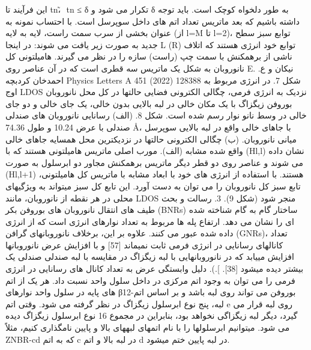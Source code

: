 این فرآیند تا tn، ̃ tn ≤ δ تکرار می شود و δ به طور دلخواه کوچک است. باید توجه داشته باشیم که بعد ماتریس تعداد اتم های داخل سوپرسل است. با احتساب نمونه به عنوان بخشی از سرب سمت راست، لایه به لایه (از l=M تا l=2)، توابع سبز سطح جدید به صورت زیر یافت می شوند:
در اینجا L (R) توابع خود انرژی هستند که اتلاف ناشی از برهمکنش با سمت چپ (راست) سازه را در نظر می گیرند. هامیلتونی کل نانوروبان به شکل یک ماتریس سه قطری است که در آن عناصر روی E. نیکان و ع. احمدخان کردبچه Physics Letters A 451 (2022) 128388 شکل 7. در انرژی مربوط به اوج LDOS نزدیک به انرژی فرمی، چگالی الکترونی فضایی حالتها در کل محل نانوروبان بوروفن زیگزاگ با یک مکان خالی در لبه بالایی بدون خالی، یک جای خالی و دو جای خالی در وسط نانو نوار رسم شده است. شکل 8. (الف) رسانایی نانوروبان های صندلی صندلی با عرض 10.24 و طول 74.36 Å، با جاهای خالی واقع در لبه بالایی سوپرسل میانی نانوروبان. (ب) چگالی الکترونی حالتها در نزدیکترین محل همسایه جاهای خالی واقع شده مشابه (الف). مورب اصلی ماتریس هامیلتونی هستند که با (Hl,l) نشان داده می شوند و عناصر روی دو قطر دیگر ماتریس برهمکنش مجاور دو ابرسلول به صورت (Hl,l+1) هستند. با استفاده از انرژی های خود با ابعاد مشابه با ماتریس کل هامیلتونی، تابع سبز کل نانوروبان را می توان به دست آورد. این تابع کل سبز میتواند به ویژگیهای محلی در هر نقطه از نانوروبان، مانند LDOS منجر شود (شکل 9).
3. رسالت و بحث طیف های انتقال نانوروبان های بوروفن بکر (BNRs) ساختار گام به گام شناخته شده ای را نشان می دهد. ارتفاع پله ها مربوط به تعداد نوارهای انرژی است که از انرژی داده شده عبور می کنند. علاوه بر این، برخلاف نانوروبانهای گرافن (GNRs)، تعداد کانالهای رسانایی در انرژی فرمی ثابت نمیماند [57] و با افزایش عرض نانوروبانها افزایش مییابد که در نانوروبانهایی با لبه زیگزاگ در مقایسه با لبه صندلی صندلی یک بیشتر دیده میشود [38]. ].). دلیل وابستگی عرض به تعداد کانال های رسانایی در انرژی فرمی را می توان به وجود اتم مرکزی در داخل سلول واحد نسبت داد. هر یک از اتم های پایه در سلول واحد نوارهای β12-بوروفن می تواند روی لبه باشد و بر اساس اتم لبه، پنج نوع ابرسلول زیگزاگ در نظر گرفته می شود. وقتی اتم e روی لبه قرار می گیرد، دیگر لبه زیگزاگی نخواهد بود، بنابراین در مجموع 16 نوع ابرسلول زیگزاگ دیده می شود. میتوانیم ابرسلولها را با نام اتمهای لبههای بالا و پایین نامگذاری کنیم، مثلاً ZNBR-cd که به اتم c در لبه بالا و اتم d در لبه پایین ختم میشود. 

